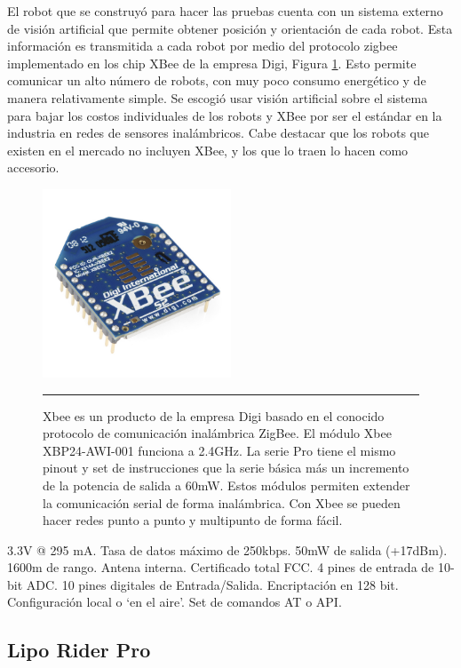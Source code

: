 El robot que se construyó para hacer las pruebas cuenta con un sistema externo de visión artificial que permite obtener posición y orientación de cada robot. Esta información es transmitida a cada robot por medio del protocolo zigbee implementado en los chip XBee de la empresa Digi, Figura \ref{fig:xbee}. Esto permite comunicar un alto número de robots, con muy poco consumo energético y de manera relativamente simple. Se escogió usar visión artificial sobre el sistema para bajar los costos individuales de los robots y XBee por ser el estándar en la industria en redes de sensores inalámbricos. Cabe destacar que los robots que existen en el mercado no incluyen XBee, y los que lo traen lo hacen como accesorio. 


\begin{figure}[htbp]
	\centering
		\includegraphics[width=0.5\textwidth]{./Figures/MODI/xbee.jpg}
		\rule{35em}{0.5pt}
	\caption[xbee]{Xbee es un producto de la empresa Digi basado en el conocido protocolo de comunicación inalámbrica ZigBee. El módulo Xbee XBP24-AWI-001 funciona a 2.4GHz. La serie Pro tiene el mismo pinout y set de instrucciones que la serie básica más un incremento de la potencia de salida a 60mW. Estos módulos permiten extender la comunicación serial de forma inalámbrica.
Con Xbee se pueden hacer redes punto a punto y multipunto de forma fácil.}
	\label{fig:xbee}
\end{figure}

3.3V @ 295 mA.
Tasa de datos máximo de 250kbps.
50mW de salida (+17dBm).
1600m de rango.
Antena interna.
Certificado total FCC.
4 pines de entrada de 10-bit ADC.
10 pines digitales de Entrada/Salida.
Encriptación en 128 bit.
Configuración local o ‘en el aire’.
Set de comandos AT o API.




\subsection{Lipo Rider Pro}

